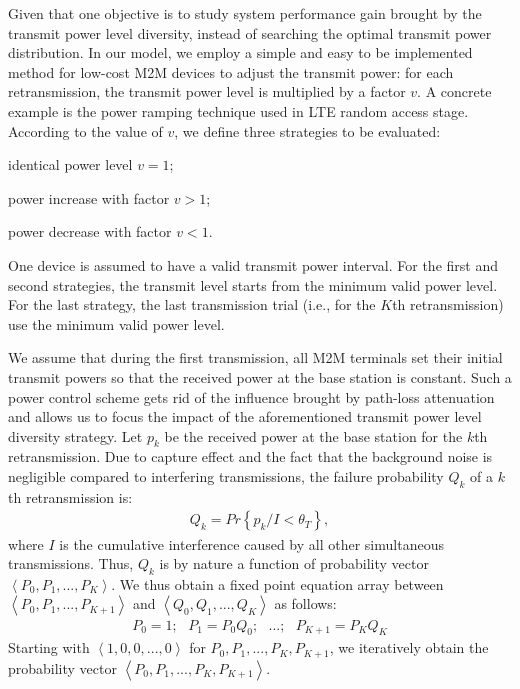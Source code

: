 Given that one objective is to study system performance gain brought by the transmit power level diversity, instead of searching the optimal transmit power distribution.
In our model, we employ a simple and easy to be implemented method for low-cost M2M devices to adjust the transmit power: for each retransmission, the transmit power level is multiplied by a factor $v$. A concrete example is the power ramping technique used in LTE random access stage. According to the value of $v$, we define three strategies to be evaluated: \begin{inparaenum}[a)]
	\item identical power level $v=1$; 
	\item power increase with factor $v > 1$;
	\item power decrease with factor $v < 1$.
\end{inparaenum}
One device is assumed to have a valid transmit power interval. For the first and second strategies, the transmit level starts from the minimum valid power level. For the last strategy, the last transmission trial (i.e., for the $K$th retransmission) use the minimum valid power level.

We assume that during the first transmission, all M2M terminals set their initial transmit powers so that the received power at the base station is constant. Such a power control scheme gets rid of the influence brought by path-loss attenuation and allows us to focus the impact of the aforementioned transmit power level diversity strategy. Let $p_k$ be the received power at the base station for the $k$th retransmission. Due to capture effect and the fact that the background noise is negligible compared to interfering transmissions, the failure probability $Q_{k}$ of a $k$th retransmission is:
\begin{align}
	Q_{k} = Pr\left\lbrace p_k/I < \theta_{T} \right\rbrace,
\end{align}
where $I$ is the cumulative interference caused by all other simultaneous transmissions. Thus, $Q_{k}$ is by nature a function of probability vector $\left\langle P_0, P_1, ..., P_K\right\rangle$. We thus obtain a fixed point equation array between $\left\langle P_0, P_1, ..., P_{K+1}\right\rangle$ and $\left\langle Q_0, Q_1, ..., Q_K\right\rangle$ as follows:   
\begin{align}
\label{eq:recurrisve-array}
P_0 = 1; \text{ }P_1 = P_0 Q_0; \text{ }...; \text{ } P_{K+1} = P_{K} Q_{K}
\end{align}
Starting with $\left\langle 1, 0, 0, ..., 0\right\rangle $ for $P_0, P_1, ..., P_K, P_{K+1}$, we iteratively obtain the probability vector $\left\langle P_0, P_1, ..., P_K, P_{K+1}\right\rangle$.


